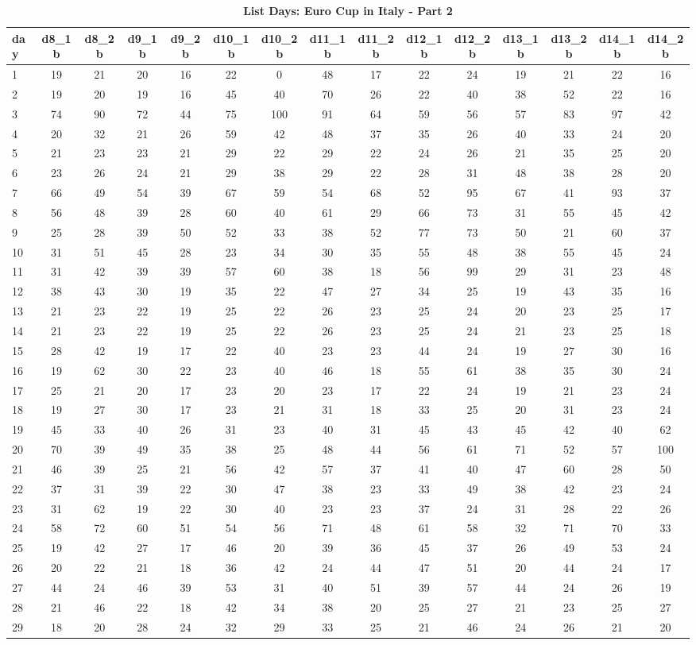 \documentclass[a4paper,12pt]{article}
\begin{document}
\begin{landscape}
\begin{footnotesize}
\begin{center}
\begin{longtable}{lcccccccccccccc}
\caption{\textbf{List Days: Euro Cup in Italy - Part 2}\label{tab_it_1b}}
\hline
day&d8\_1b&d8\_2b&d9\_1b&d9\_2b&d10\_1b&d10\_2b&d11\_1b&d11\_2b&d12\_1b&d12\_2b&d13\_1b&d13\_2b&d14\_1b&d14\_2b \\ \hline
1&19&21&20&16&22&0&48&17&22&24&19&21&22&16 \\
2&19&20&19&16&45&40&70&26&22&40&38&52&22&16 \\
3&74&90&72&44&75&100&91&64&59&56&57&83&97&42 \\
4&20&32&21&26&59&42&48&37&35&26&40&33&24&20 \\
5&21&23&23&21&29&22&29&22&24&26&21&35&25&20 \\
6&23&26&24&21&29&38&29&22&28&31&48&38&28&20 \\
7&66&49&54&39&67&59&54&68&52&95&67&41&93&37 \\
8&56&48&39&28&60&40&61&29&66&73&31&55&45&42 \\
9&25&28&39&50&52&33&38&52&77&73&50&21&60&37 \\
10&31&51&45&28&23&34&30&35&55&48&38&55&45&24 \\
11&31&42&39&39&57&60&38&18&56&99&29&31&23&48 \\
12&38&43&30&19&35&22&47&27&34&25&19&43&35&16 \\
13&21&23&22&19&25&22&26&23&25&24&20&23&25&17 \\
14&21&23&22&19&25&22&26&23&25&24&21&23&25&18 \\
15&28&42&19&17&22&40&23&23&44&24&19&27&30&16 \\
16&19&62&30&22&23&40&46&18&55&61&38&35&30&24 \\
17&25&21&20&17&23&20&23&17&22&24&19&21&23&24 \\
18&19&27&30&17&23&21&31&18&33&25&20&31&23&24 \\
19&45&33&40&26&31&23&40&31&45&43&45&42&40&62 \\
20&70&39&49&35&38&25&48&44&56&61&71&52&57&100 \\
21&46&39&25&21&56&42&57&37&41&40&47&60&28&50 \\
22&37&31&39&22&30&47&38&23&33&49&38&42&23&24 \\
23&31&62&19&22&30&40&23&23&37&24&31&28&22&26 \\
24&58&72&60&51&54&56&71&48&61&58&32&71&70&33 \\
25&19&42&27&17&46&20&39&36&45&37&26&49&53&24 \\
26&20&22&21&18&36&42&24&44&47&51&20&44&24&17 \\
27&44&24&46&39&53&31&40&51&39&57&44&24&26&19 \\
28&21&46&22&18&42&34&38&20&25&27&21&23&25&27 \\
29&18&20&28&24&32&29&33&25&21&46&24&26&21&20 \\ \hline
\end{longtable}
\end{center}
\end{footnotesize}
\end{landscape}
\end{document}

